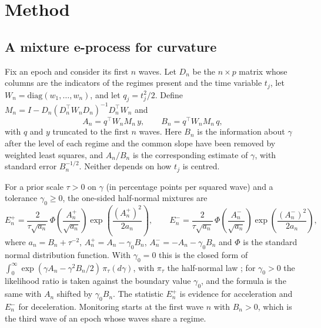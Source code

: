 \documentclass[Afour,sageh,times]{sagej}
\theoremstyle{definition}
\begin{document}
\section{Method}
\label{sec:method}

\subsection{A mixture e-process for curvature}
\label{sec:eprocess}

Fix an epoch and consider its first $n$ waves. Let $D_n$ be the $n \times p$ matrix whose columns are the indicators of the regimes present and the time variable $t_j$, let $W_n = \mathrm{diag}(w_1, \dots, w_n)$, and let $q_j = t_j^2/2$. Define $M_n = I - D_n (D_n^\top W_n D_n)^{-1} D_n^\top W_n$ and
\begin{equation}
A_n = q^\top W_n M_n\, y, \qquad B_n = q^\top W_n M_n\, q,
\label{eq:AB}
\end{equation}
with $q$ and $y$ truncated to the first $n$ waves. Here $B_n$ is the information about $\gamma$ after the level of each regime and the common slope have been removed by weighted least squares, and $A_n/B_n$ is the corresponding estimate of $\gamma$, with standard error $B_n^{-1/2}$. Neither depends on how $t_j$ is centred.

For a prior scale $\tau > 0$ on $\gamma$ (in percentage points per squared wave) and a tolerance $\gamma_0 \ge 0$, the one-sided half-normal mixtures are
\begin{equation}
E_n^{+} = \frac{2}{\tau\sqrt{a_n}}\, \Phi\!\left(\frac{A_n^{+}}{\sqrt{a_n}}\right) \exp\!\left(\frac{(A_n^{+})^2}{2 a_n}\right), \qquad
E_n^{-} = \frac{2}{\tau\sqrt{a_n}}\, \Phi\!\left(\frac{A_n^{-}}{\sqrt{a_n}}\right) \exp\!\left(\frac{(A_n^{-})^2}{2 a_n}\right),
\label{eq:E}
\end{equation}
where $a_n = B_n + \tau^{-2}$, $A_n^{+} = A_n - \gamma_0 B_n$, $A_n^{-} = -A_n - \gamma_0 B_n$ and $\Phi$ is the standard normal distribution function. With $\gamma_0 = 0$ this is the closed form of $\int_0^\infty \exp(\gamma A_n - \gamma^2 B_n/2)\,\pi_\tau(d\gamma)$, with $\pi_\tau$ the half-normal law \citep{robbins1970}; for $\gamma_0 > 0$ the likelihood ratio is taken against the boundary value $\gamma_0$, and the formula is the same with $A_n$ shifted by $\gamma_0 B_n$. The statistic $E_n^{+}$ is evidence for acceleration and $E_n^{-}$ for deceleration. Monitoring starts at the first wave $n$ with $B_n > 0$, which is the third wave of an epoch whose waves share a regime.
\end{document}
